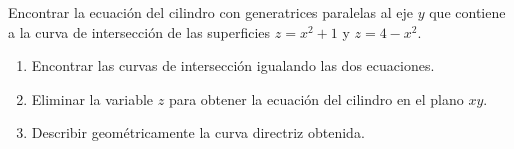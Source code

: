 Encontrar la ecuación del cilindro con generatrices paralelas al eje $y$ que contiene a la curva de intersección de las superficies $z = x^2 + 1$ y $z = 4 - x^2$.

\begin{enumerate}
    \item Encontrar las curvas de intersección igualando las dos ecuaciones.
    \item Eliminar la variable $z$ para obtener la ecuación del cilindro en el plano $xy$.
    \item Describir geométricamente la curva directriz obtenida.
\end{enumerate}